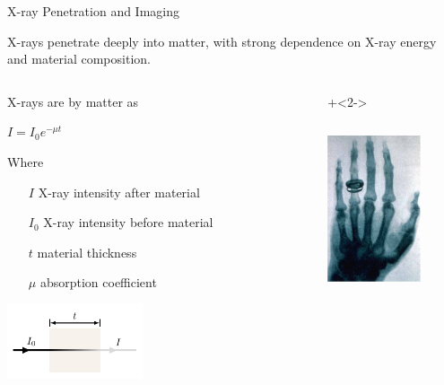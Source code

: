 

\begin{slide}{X-ray Penetration and Imaging}

  \begin{cenpage}{150mm}

    X-rays penetrate deeply into matter, with strong dependence on  X-ray
    energy and  material composition.
  
 \vmm\vmm
  
     
     \begin{columns}
       \begin{column}{55mm}

         X-rays are {} by matter as
         
         \begin{postitbox}{18mm}
           {  $ \displaystyle  I = I_0 e^{-\mu t} $   }
         \end{postitbox}


       Where
       \begin{itemize}
       \item[$I$]       X-ray intensity after material
       \item[$I_0$]    X-ray intensity before material
       \item[$t$]        material thickness
       \item[$\mu$]    absorption coefficient
       \end{itemize}

       \vmm\vmm

       \hspace{7mm} \includegraphics[width=40mm]{figs/rimg/beer_lambert}
       
         \end{column}
         \begin{column}{1mm}
         \end{column}
         \begin{column}{75mm}
           \onslide+<2-> {

           \begin{columns}
             \begin{column}{35mm}
               \includegraphics[height=43mm]{figs/images/XrayHand}
               

\end{column}
\end{columns}}
\end{column}
\end{columns}
\end{cenpage}
\end{slide}
